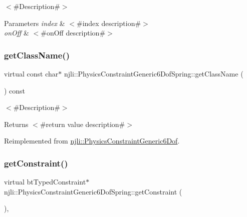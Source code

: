 $<$\#\+Description\#$>$


\begin{DoxyParams}{Parameters}
{\em index} & $<$\#index description\#$>$ \\
\hline
{\em on\+Off} & $<$\#on\+Off description\#$>$ \\
\hline
\end{DoxyParams}
\mbox{\label{classnjli_1_1_physics_constraint_generic6_dof_spring_a8a44bad32336f595195ccfa836a91068}} 
\subsubsection{\texorpdfstring{get\+Class\+Name()}{getClassName()}}
{\footnotesize\ttfamily virtual const char$\ast$ njli\+::\+Physics\+Constraint\+Generic6\+Dof\+Spring\+::get\+Class\+Name (\begin{DoxyParamCaption}{ }\end{DoxyParamCaption}) const\hspace{0.3cm}{\ttfamily [virtual]}}

$<$\#\+Description\#$>$

\begin{DoxyReturn}{Returns}
$<$\#return value description\#$>$ 
\end{DoxyReturn}


Reimplemented from \mbox{\hyperlink{classnjli_1_1_physics_constraint_generic6_dof_a29b23a079a5d93600a701d7635fb26cd}{njli\+::\+Physics\+Constraint\+Generic6\+Dof}}.

\mbox{\label{classnjli_1_1_physics_constraint_generic6_dof_spring_aa90bf42f88d0314d834a6b3d670ba90d}} 
\subsubsection{\texorpdfstring{get\+Constraint()}{getConstraint()}\hspace{0.1cm}{\footnotesize\ttfamily [1/2]}}
{\footnotesize\ttfamily virtual bt\+Typed\+Constraint$\ast$ njli\+::\+Physics\+Constraint\+Generic6\+Dof\+Spring\+::get\+Constraint (\begin{DoxyParamCaption}{ }\end{DoxyParamCaption})\hspace{0.3cm}{\ttfamily [protected]}, {\ttfamily [virtual]}}



